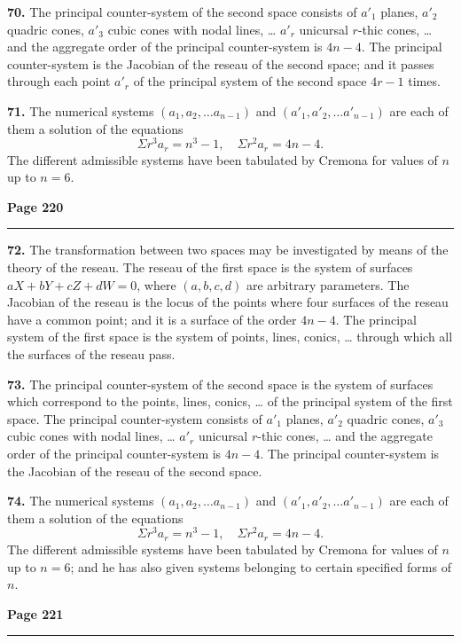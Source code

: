 \documentclass[12pt,a4paper]{article}
\theoremstyle{plain}
\theoremstyle{definition}
\theoremstyle{remark}
\begin{document}
\textbf{70.} The principal counter-system of the second space consists of $a'_1$ planes, $a'_2$ quadric cones, $a'_3$ cubic cones with nodal lines, \ldots{} $a'_r$ unicursal $r$-thic cones, \ldots{} and the aggregate order of the principal counter-system is $4n - 4$. The principal counter-system is the Jacobian of the reseau of the second space; and it passes through each point $a'_r$ of the principal system of the second space $4r - 1$ times.

\textbf{71.} The numerical systems $(a_1, a_2, \ldots a_{n-1})$ and $(a'_1, a'_2, \ldots a'_{n-1})$ are each of them a solution of the equations
\[
\Sigma r^3 a_r = n^3 - 1, \quad \Sigma r^2 a_r = 4n - 4.
\]
The different admissible systems have been tabulated by Cremona for values of $n$ up to $n = 6$.

\newpage
\noindent\textbf{Page 220}\\
\noindent\rule{\textwidth}{0.4pt}

\smallskip

\noindent\textbf{72.} The transformation between two spaces may be investigated by means of the theory of the reseau. The reseau of the first space is the system of surfaces $aX + bY + cZ + dW = 0$, where $(a, b, c, d)$ are arbitrary parameters. The Jacobian of the reseau is the locus of the points where four surfaces of the reseau have a common point; and it is a surface of the order $4n - 4$. The principal system of the first space is the system of points, lines, conics, \ldots{} through which all the surfaces of the reseau pass.

\textbf{73.} The principal counter-system of the second space is the system of surfaces which correspond to the points, lines, conics, \ldots{} of the principal system of the first space. The principal counter-system consists of $a'_1$ planes, $a'_2$ quadric cones, $a'_3$ cubic cones with nodal lines, \ldots{} $a'_r$ unicursal $r$-thic cones, \ldots{} and the aggregate order of the principal counter-system is $4n - 4$. The principal counter-system is the Jacobian of the reseau of the second space.

\textbf{74.} The numerical systems $(a_1, a_2, \ldots a_{n-1})$ and $(a'_1, a'_2, \ldots a'_{n-1})$ are each of them a solution of the equations
\[
\Sigma r^3 a_r = n^3 - 1, \quad \Sigma r^2 a_r = 4n - 4.
\]
The different admissible systems have been tabulated by Cremona for values of $n$ up to $n = 6$; and he has also given systems belonging to certain specified forms of $n$.

\newpage
\noindent\textbf{Page 221}\\
\noindent\rule{\textwidth}{0.4pt}
\end{document}

